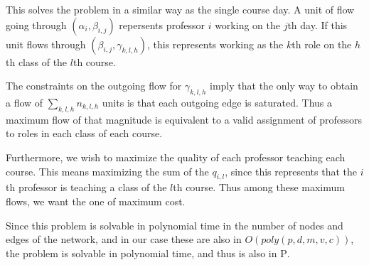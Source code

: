 This solves the problem in a similar way as the single course day. A unit of flow going through $(\alpha_i, \beta_{i, j})$ repersents professor $i$ working on the $j$th day. If this unit flows through $(\beta_{i, j}, \gamma_{k, l, h})$, this represents working as the $k$th role on the $h$th class of the $l$th course.

The constraints on the outgoing flow for $\gamma_{k, l, h}$ imply that the only way to obtain a flow of $\sum_{k, l, h} n_{k, l, h}$ units is that each outgoing edge is saturated. Thus a maximum flow of that magnitude is equivalent to a valid assignment of professors to roles in each class of each course.

Furthermore, we wish to maximize the quality of each professor teaching each course. This means maximizing the sum of the $q_{i, l}$, since this represents that the $i$th professor is teaching a class of the $l$th course. Thus among these maximum flows, we want the one of maximum cost.

Since this problem is solvable in polynomial time in the number of nodes and edges of the network, and in our case these are also in $O(poly(p, d, m, v, c))$, the problem is solvable in polynomial time, and thus is also in \textsc{P}.
